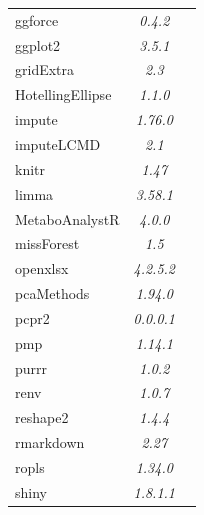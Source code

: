 \documentclass[ENG, BIB]{TFUOC}%
\begin{document}
\begin{longtable}[c]{@{}lcc@{}}
    ggforce                              & \textit{0.4.2}   & \cite{R-ggforce}              \\
    ggplot2                              & \textit{3.5.1}   & \cite{R-ggplot2}              \\
    gridExtra                            & \textit{2.3}     & \cite{R-gridExtra}            \\
    HotellingEllipse                     & \textit{1.1.0}   & \cite{R-HotellingEllipse}     \\
    impute                               & \textit{1.76.0}  & \cite{R-impute}               \\
    imputeLCMD                           & \textit{2.1}     & \cite{R-imputeLCMD}           \\
    knitr                                & \textit{1.47}    & \cite{R-knitr}                \\
    limma                                & \textit{3.58.1}  & \cite{R-limma}                \\
    MetaboAnalystR                       & \textit{4.0.0}   & \cite{R-MetaboAnalystR}       \\
    missForest                           & \textit{1.5}     & \cite{R-missForest}           \\
    openxlsx                             & \textit{4.2.5.2} & \cite{R-openxlsx}             \\
    pcaMethods                           & \textit{1.94.0}  & \cite{R-pcaMethods}           \\
    pcpr2                                & \textit{0.0.0.1} & \cite{R-pcpr2}                \\
    pmp                                  & \textit{1.14.1}  & \cite{R-pmp}                  \\
    purrr                                & \textit{1.0.2}   & \cite{R-purrr}                \\
    renv                                 & \textit{1.0.7}   & \cite{R-renv}                 \\
    reshape2                             & \textit{1.4.4}   & \cite{R-reshape2}             \\
    rmarkdown                            & \textit{2.27}    & \cite{R-rmarkdown}            \\
    ropls                                & \textit{1.34.0}  & \cite{R-ropls}                \\
    shiny                                & \textit{1.8.1.1} & \cite{R-shiny}                \\

\end{longtable}
\end{document}
